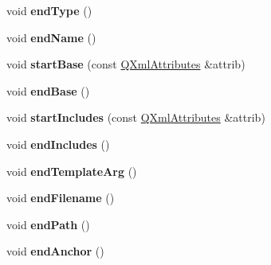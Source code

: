 \begin{DoxyCompactItemize}
\item 
\hypertarget{class_tag_file_parser_a3548978e26da9ea52089b4db7188d1a7}{void {\bfseries end\-Type} ()}\label{class_tag_file_parser_a3548978e26da9ea52089b4db7188d1a7}

\item 
\hypertarget{class_tag_file_parser_a868f8da2b2359477e050549430602266}{void {\bfseries end\-Name} ()}\label{class_tag_file_parser_a868f8da2b2359477e050549430602266}

\item 
\hypertarget{class_tag_file_parser_a3b77aab4c9779fc42e443390baf762ae}{void {\bfseries start\-Base} (const \hyperlink{class_q_xml_attributes}{Q\-Xml\-Attributes} \&attrib)}\label{class_tag_file_parser_a3b77aab4c9779fc42e443390baf762ae}

\item 
\hypertarget{class_tag_file_parser_a65c140fd3f77b0f51cc76a06e538d3d8}{void {\bfseries end\-Base} ()}\label{class_tag_file_parser_a65c140fd3f77b0f51cc76a06e538d3d8}

\item 
\hypertarget{class_tag_file_parser_a3eab2f5931842aad8f91a48005110d27}{void {\bfseries start\-Includes} (const \hyperlink{class_q_xml_attributes}{Q\-Xml\-Attributes} \&attrib)}\label{class_tag_file_parser_a3eab2f5931842aad8f91a48005110d27}

\item 
\hypertarget{class_tag_file_parser_afdbf965914d14de0326c5ed68e5d3211}{void {\bfseries end\-Includes} ()}\label{class_tag_file_parser_afdbf965914d14de0326c5ed68e5d3211}

\item 
\hypertarget{class_tag_file_parser_af6b57ce183e6dbad8873b834cd07d574}{void {\bfseries end\-Template\-Arg} ()}\label{class_tag_file_parser_af6b57ce183e6dbad8873b834cd07d574}

\item 
\hypertarget{class_tag_file_parser_ab48bda51a2dc0a7b1025481fae2bdd34}{void {\bfseries end\-Filename} ()}\label{class_tag_file_parser_ab48bda51a2dc0a7b1025481fae2bdd34}

\item 
\hypertarget{class_tag_file_parser_adf1fe04d3567e10a8ad0f4cb3e4b263f}{void {\bfseries end\-Path} ()}\label{class_tag_file_parser_adf1fe04d3567e10a8ad0f4cb3e4b263f}

\item 
\hypertarget{class_tag_file_parser_af1003a9106437d3fa31091d86e6ff514}{void {\bfseries end\-Anchor} ()}\label{class_tag_file_parser_af1003a9106437d3fa31091d86e6ff514}


\end{DoxyCompactItemize}
